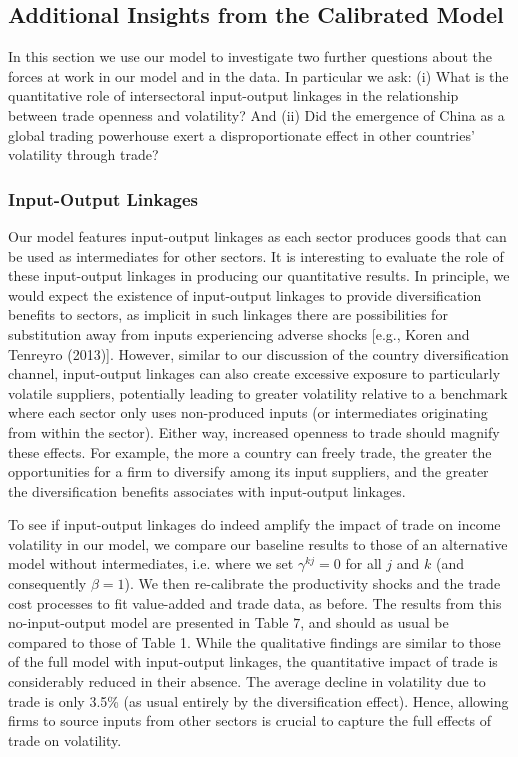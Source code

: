 \documentclass[12pt]{article}
\begin{document}
\subsection{Additional Insights from the Calibrated Model}

In this section we use our model to investigate two further questions about
the forces at work in our model and in the data. In particular we ask: (i)
What is the quantitative role of intersectoral input-output linkages in the
relationship between trade openness and volatility? And (ii) Did the
emergence of China as a global trading powerhouse exert a disproportionate
effect in other countries' volatility through trade?

\subsubsection{Input-Output Linkages}

Our model features input-output linkages as each sector produces goods that
can be used as intermediates for other sectors. It is interesting to
evaluate the role of these input-output linkages in producing our
quantitative results. In principle, we would expect the existence of
input-output linkages to provide diversification benefits to sectors, as
implicit in such linkages there are possibilities for substitution away from
inputs experiencing adverse shocks [e.g., Koren and Tenreyro (2013)].
However, similar to our discussion of the country diversification channel,
input-output linkages can also create excessive exposure to particularly
volatile suppliers, potentially leading to greater volatility relative to a
benchmark where each sector only uses non-produced inputs (or intermediates
originating from within the sector). Either way, increased openness to trade
should magnify these effects. For example, the more a country can freely
trade, the greater the opportunities for a firm to diversify among its input
suppliers, and the greater the diversification benefits associates with
input-output linkages.

To see if input-output linkages do indeed amplify the impact of trade on
income volatility in our model, we compare our baseline results to those of
an alternative model without intermediates, i.e. where we set $\gamma
^{kj}=0 $ for all $j$ and $k$ (and consequently $\beta =1$). We then
re-calibrate the productivity shocks and the trade cost processes to fit
value-added and trade data, as before. The results from this no-input-output
model are presented in Table $7$, and should as usual be compared to those
of Table 1. While the qualitative findings are similar to those of the full
model with input-output linkages, the quantitative impact of trade is
considerably reduced in their absence. The average decline in volatility due
to trade is only 3.5\% (as usual entirely by the diversification effect).
Hence, allowing firms to source inputs from other sectors is crucial to
capture the full effects of trade on volatility.
\end{document}
